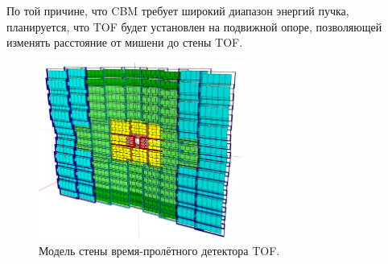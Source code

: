По той причине, что CBM требует широкий диапазон энергий пучка, планируется, что TOF будет установлен на подвижной опоре, позволяющей изменять расстояние от мишени до стены TOF.


\begin{figure}[H]
\centering
\includegraphics[width=0.6\textwidth]{pictures/TOF.png}
\caption{Модель стены время-пролётного детектора TOF.}
\label{fig:TOF}
\end{figure}

